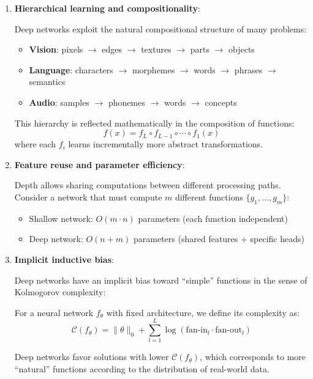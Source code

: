 \begin{enumerate}
	\item \textbf{Hierarchical learning and compositionality}:

	Deep networks exploit the natural compositional structure of many problems:

	\begin{itemize}
		\item \textbf{Vision}: pixels \(\to\) edges \(\to\) textures \(\to\) parts \(\to\) objects
		\item \textbf{Language}: characters \(\to\) morphemes \(\to\) words \(\to\) phrases \(\to\) semantics
		\item \textbf{Audio}: samples \(\to\) phonemes \(\to\) words \(\to\) concepts
	\end{itemize}

	This hierarchy is reflected mathematically in the composition of functions:
	\[
		f(x) = f_L \circ f_{L-1} \circ \cdots \circ f_1(x)
	\]
	where each \(f_i\) learns incrementally more abstract transformations.

	\item \textbf{Feature reuse and parameter efficiency}:

	Depth allows sharing computations between different processing paths. Consider a network that must compute \(m\) different functions \(\{g_1, \ldots, g_m\}\):

	\begin{itemize}
		\item Shallow network: \(O(m \cdot n)\) parameters (each function independent)
		\item Deep network: \(O(n + m)\) parameters (shared features + specific heads)
	\end{itemize}

	\item \textbf{Implicit inductive bias}:

	Deep networks have an implicit bias toward ``simple'' functions in the sense of Kolmogorov complexity:

	\begin{definition}\label{def:complejidad_funcion}
		For a neural network \(f_\theta\) with fixed architecture, we define its complexity as:
		\[
			\mathcal{C}(f_\theta) = \|\theta\|_0 + \sum_{l=1}^L \log(\text{fan-in}_l \cdot \text{fan-out}_l)
		\]
	\end{definition}

	Deep networks favor solutions with lower \(\mathcal{C}(f_\theta)\), which corresponds to more ``natural'' functions according to the distribution of real-world data.


\end{enumerate}
